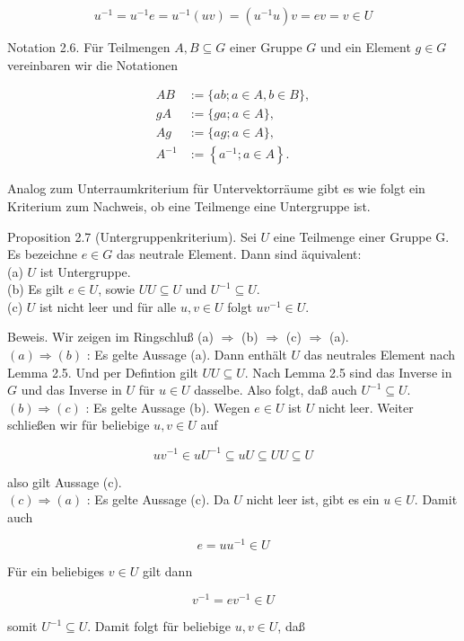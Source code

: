 \documentclass[10pt, letterpaper]{article}
\begin{document}
$$
u^{-1}=u^{-1} e=u^{-1}(u v)=\left(u^{-1} u\right) v=e v=v \in U
$$

Notation 2.6. Für Teilmengen $A, B \subseteq G$ einer Gruppe $G$ und ein Element $g \in G$ vereinbaren wir die Notationen

$$
\begin{aligned}
A B & :=\{a b ; a \in A, b \in B\}, \\
g A & :=\{g a ; a \in A\}, \\
A g & :=\{a g ; a \in A\}, \\
A^{-1} & :=\left\{a^{-1} ; a \in A\right\} .
\end{aligned}
$$

Analog zum Unterraumkriterium für Untervektorräume gibt es wie folgt ein Kriterium zum Nachweis, ob eine Teilmenge eine Untergruppe ist.

Proposition 2.7 (Untergruppenkriterium). Sei $U$ eine Teilmenge einer Gruppe G. Es bezeichne $e \in G$ das neutrale Element. Dann sind äquivalent:\\
(a) $U$ ist Untergruppe.\\
(b) Es gilt $e \in U$, sowie $U U \subseteq U$ und $U^{-1} \subseteq U$.\\
(c) $U$ ist nicht leer und für alle $u, v \in U$ folgt $u v^{-1} \in U$.

Beweis. Wir zeigen im Ringschluß (a) $\Longrightarrow$ (b) $\Longrightarrow$ (c) $\Longrightarrow$ (a).\\
$(a) \Longrightarrow(b)$ : Es gelte Aussage (a). Dann enthält $U$ das neutrales Element nach Lemma 2.5. Und per Defintion gilt $U U \subseteq U$. Nach Lemma 2.5 sind das Inverse in $G$ und das Inverse in $U$ für $u \in U$ dasselbe. Also folgt, daß auch $U^{-1} \subseteq U$.\\
$(b) \Longrightarrow(c)$ : Es gelte Aussage (b). Wegen $e \in U$ ist $U$ nicht leer. Weiter schließen wir für beliebige $u, v \in U$ auf

$$
u v^{-1} \in u U^{-1} \subseteq u U \subseteq U U \subseteq U
$$

also gilt Aussage (c).\\
$(c) \Longrightarrow(a)$ : Es gelte Aussage (c). Da $U$ nicht leer ist, gibt es ein $u \in U$. Damit auch

$$
e=u u^{-1} \in U
$$

Für ein beliebiges $v \in U$ gilt dann

$$
v^{-1}=e v^{-1} \in U
$$

somit $U^{-1} \subseteq U$. Damit folgt für beliebige $u, v \in U$, daß
\end{document}
